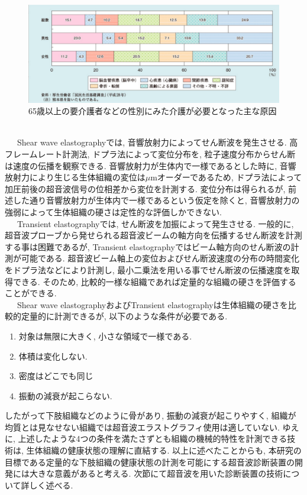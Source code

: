 \begin{figure}[h]
  \begin{center}
    \includegraphics[width=140mm]{fig/kaigo.pdf}
  \end{center}
  \caption{65歳以上の要介護者などの性別にみた介護が必要となった主な原因\cite{kaigogenin}}
\end{figure}
\\\ \ \ Shear wave elastographyでは, 音響放射力によってせん断波を発生させる. 高フレームレート計測法, ドプラ法によって変位分布を, 粒子速度分布からせん断は速度の伝播を観察できる. 音響放射力が生体内で一様であるとした時に, 音響放射力により生じる生体組織の変位は$\mu$mオーダーであるため, ドプラ法によって加圧前後の超音波信号の位相差から変位を計測する\cite{elastographygenri}. 変位分布は得られるが, 前述した通り音響放射力が生体内で一様であるという仮定を除くと, 音響放射力の強弱によって生体組織の硬さは定性的な評価しかできない.
\\\ \ \ Transient elastographyでは, せん断波を加振によって発生させる. 一般的に, 超音波プローブから発せられる超音波ビームの軸方向を伝播するせん断波を計測する事は困難であるが, Transient elastographyではビーム軸方向のせん断波の計測が可能である. 超音波ビーム軸上の変位およびせん断波速度の分布の時間変化をドプラ法などにより計測し, 最小二乗法を用いる事でせん断波の伝播速度を取得できる. そのため, 比較的一様な組織であれば定量的な組織の硬さを評価することができる. 
\\\ \ \ Shear wave elastographyおよびTransient elastographyは生体組織の硬さを比較的定量的に計測できるが, 以下のような条件が必要である\cite{elastography1}.
\begin{enumerate}
   \item 対象は無限に大きく, 小さな領域で一様である.
   \item 体積は変化しない. 
   \item 密度はどこでも同じ
   \item 振動の減衰が起こらない. 
\end{enumerate}
したがって下肢組織などのように骨があり, 振動の減衰が起こりやすく, 組織が均質とは見なせない組織では超音波エラストグラフィ使用は適していない. ゆえに, 上述したような4つの条件を満たさずとも組織の機械的特性を計測できる技術は, 生体組織の健康状態の理解に直結する. 以上に述べたことからも, 本研究の目標である定量的な下肢組織の健康状態の計測を可能にする超音波診断装置の開発には大きな意義があると考える. 次節にて超音波を用いた診断装置の技術について詳しく述べる. 
